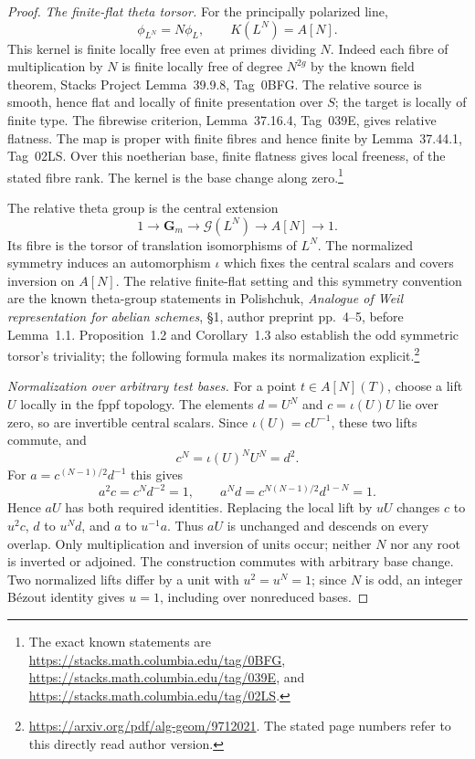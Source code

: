 \documentclass[11pt,a4paper]{article}
\theoremstyle{definition}\newtheorem{remark}[theorem]{Remark}
\begin{document}
\begin{proof}
\emph{The finite-flat theta torsor.}
For the principally polarized line,
\[
 \phi_{L^N}=N\phi_L,\qquad K(L^N)=A[N].
\]
This kernel is finite locally free even at primes dividing $N$.
Indeed each fibre of multiplication by $N$ is finite locally free of degree $N^{2g}$ by the known field theorem, Stacks Project Lemma~39.9.8, Tag~0BFG.
The relative source is smooth, hence flat and locally of finite presentation over $S$; the target is locally of finite type.
The fibrewise criterion, Lemma~37.16.4, Tag~039E, gives relative flatness.
The map is proper with finite fibres and hence finite by Lemma~37.44.1, Tag~02LS.
Over this noetherian base, finite flatness gives local freeness, of the stated fibre rank.
The kernel is the base change along zero.\footnote{The exact known statements are \url{https://stacks.math.columbia.edu/tag/0BFG}, \url{https://stacks.math.columbia.edu/tag/039E}, and \url{https://stacks.math.columbia.edu/tag/02LS}.}

The relative theta group is the central extension
\[
 1\longrightarrow\mathbf G_m\longrightarrow
 \mathcal G(L^N)\longrightarrow A[N]\longrightarrow1.
\]
Its fibre is the torsor of translation isomorphisms of $L^N$.
The normalized symmetry induces an automorphism $\iota$ which fixes the central scalars and covers inversion on $A[N]$.
The relative finite-flat setting and this symmetry convention are the known theta-group statements in Polishchuk, \emph{Analogue of Weil representation for abelian schemes}, \S1, author preprint pp.~4--5, before Lemma~1.1.
Proposition~1.2 and Corollary~1.3 also establish the odd symmetric torsor's triviality; the following formula makes its normalization explicit.\footnote{\url{https://arxiv.org/pdf/alg-geom/9712021}. The stated page numbers refer to this directly read author version.}

\emph{Normalization over arbitrary test bases.}
For a point $t\in A[N](T)$, choose a lift $U$ locally in the fppf topology.
The elements $d=U^N$ and $c=\iota(U)U$ lie over zero, so are invertible central scalars.
Since $\iota(U)=cU^{-1}$, these two lifts commute, and
\[
 c^N=\iota(U)^NU^N=d^2.
\]
For $a=c^{(N-1)/2}d^{-1}$ this gives
\[
 a^2c=c^Nd^{-2}=1,\qquad
 a^Nd=c^{N(N-1)/2}d^{1-N}=1.
\]
Hence $aU$ has both required identities.
Replacing the local lift by $uU$ changes $c$ to $u^2c$, $d$ to $u^Nd$, and $a$ to $u^{-1}a$.
Thus $aU$ is unchanged and descends on every overlap.
Only multiplication and inversion of units occur; neither $N$ nor any root is inverted or adjoined.
The construction commutes with arbitrary base change.
Two normalized lifts differ by a unit with $u^2=u^N=1$; since $N$ is odd, an integer B\'ezout identity gives $u=1$, including over nonreduced bases.


\end{proof}
\end{document}
